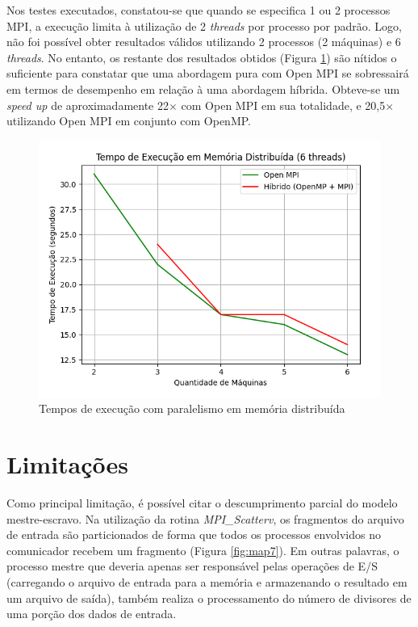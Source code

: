 \documentclass[a4paper, 12pt]{article}
\begin{document}
Nos testes executados, constatou-se que quando se especifica 1 ou 2 processos MPI, a execução limita à utilização de 2 \emph{threads} por processo por padrão. Logo, não foi possível obter resultados válidos utilizando 2 processos (2 máquinas) e 6 \emph{threads}. No entanto, os restante dos resultados obtidos (Figura \ref{fig:map6}) são nítidos o suficiente para constatar que uma abordagem pura com Open MPI se sobressairá em termos de desempenho em relação à uma abordagem híbrida. Obteve-se um \emph{speed up} de aproximadamente 22\(\times\) com Open MPI em sua totalidade, e 20,5\(\times\) utilizando Open MPI em conjunto com OpenMP.

\begin{figure}[H]
    \centering
    \includegraphics[width=1\textwidth]{Images/distributed.png}
    \vspace*{-0.8cm}
    \caption{Tempos de execução com paralelismo em memória distribuída}
    \label{fig:map6}
\end{figure}

\section{Limitações}

Como principal limitação, é possível citar o descumprimento parcial do modelo mestre-escravo. Na utilização da rotina \emph{MPI\_Scatterv}, os fragmentos do arquivo de entrada são particionados de forma que todos os processos envolvidos no comunicador recebem um fragmento (Figura \ref{fig:map7}). Em outras palavras, o processo mestre que deveria apenas ser responsável pelas operações de E/S (carregando o arquivo de entrada para a memória e armazenando o resultado em um arquivo de saída), também realiza o processamento do número de divisores de uma porção dos dados de entrada.
\end{document}
